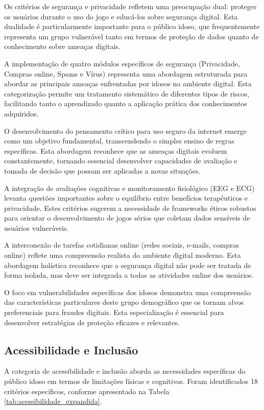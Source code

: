 \begin{table}[H]
Os critérios de segurança e privacidade refletem uma preocupação dual: proteger os usuários durante o uso do jogo e educá-los sobre segurança digital. Esta dualidade é particularmente importante para o público idoso, que frequentemente representa um grupo vulnerável tanto em termos de proteção de dados quanto de conhecimento sobre ameaças digitais.

A implementação de quatro módulos específicos de segurança (Privacidade, Compras online, Spams e Vírus) representa uma abordagem estruturada para abordar as principais ameaças enfrentadas por idosos no ambiente digital. Esta categorização permite um tratamento sistemático de diferentes tipos de riscos, facilitando tanto o aprendizado quanto a aplicação prática dos conhecimentos adquiridos.

O desenvolvimento do pensamento crítico para uso seguro da internet emerge como um objetivo fundamental, transcendendo o simples ensino de regras específicas. Esta abordagem reconhece que as ameaças digitais evoluem constantemente, tornando essencial desenvolver capacidades de avaliação e tomada de decisão que possam ser aplicadas a novas situações.

A integração de avaliações cognitivas e monitoramento fisiológico (EEG e ECG) levanta questões importantes sobre o equilíbrio entre benefícios terapêuticos e privacidade. Estes critérios sugerem a necessidade de frameworks éticos robustos para orientar o desenvolvimento de jogos sérios que coletam dados sensíveis de usuários vulneráveis.

A interconexão de tarefas cotidianas online (redes sociais, e-mails, compras online) reflete uma compreensão realista do ambiente digital moderno. Esta abordagem holística reconhece que a segurança digital não pode ser tratada de forma isolada, mas deve ser integrada a todas as atividades online dos usuários.

O foco em vulnerabilidades específicas dos idosos demonstra uma compreensão das características particulares deste grupo demográfico que os tornam alvos preferenciais para fraudes digitais. Esta especialização é essencial para desenvolver estratégias de proteção eficazes e relevantes.

\subsection{Acessibilidade e Inclusão}
\label{subsec:acessibilidade_expandida}

A categoria de acessibilidade e inclusão aborda as necessidades específicas do público idoso em termos de limitações físicas e cognitivas. Foram identificados 18 critérios específicos, conforme apresentado na Tabela \ref{tab:acessibilidade_expandida}.


\end{table}
